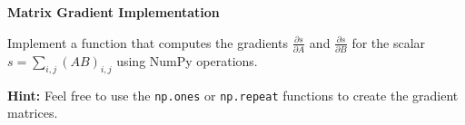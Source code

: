\item {} \textbf{Matrix Gradient Implementation}

Implement a function that computes the gradients $\frac{\partial s}{\partial A}$ and $\frac{\partial s}{\partial B}$ for the scalar $s = \sum_{i,j} (AB)_{i,j}$ using NumPy operations.

\textbf{Hint: }Feel free to use the \texttt{np.ones} or \texttt{np.repeat} functions to create the gradient matrices.

